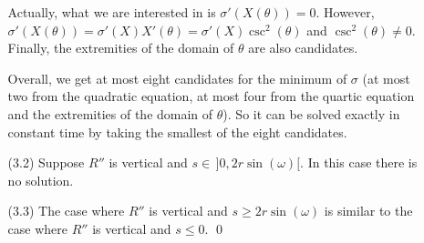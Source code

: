 \documentclass[11pt, oneside]{article}
\begin{document}
\begin{enumerate}
\begin{enumerate}
Actually,
what we are interested in is $\sigma'(X(\theta))=0$.
However,
$\sigma'(X(\theta))=\sigma'(X)X'(\theta)=\sigma'(X)\csc^2\!(\theta)$
and $\csc^2\!(\theta) \neq 0$.
Finally,
the extremities of the domain of $\theta$
are also candidates.

Overall, 
we get at most eight candidates for the minimum of $\sigma$
(at most two from the quadratic equation, 
at most four from the quartic equation
and the extremities of the domain of $\theta$).
So it can be solved exactly in constant time 
by taking the smallest of the eight candidates.

\item[(3.2)] Suppose $R''$ is vertical and $s\in\,]0,2r\sin(\omega)[$.
In this case there is no solution.

\item[(3.3)] The case where $R''$ is vertical and $s\geq 2r\sin(\omega)$
is similar to the case where $R''$ is vertical and $s\leq 0$.
\qed
\end{enumerate}
\end{enumerate}
\end{document}
